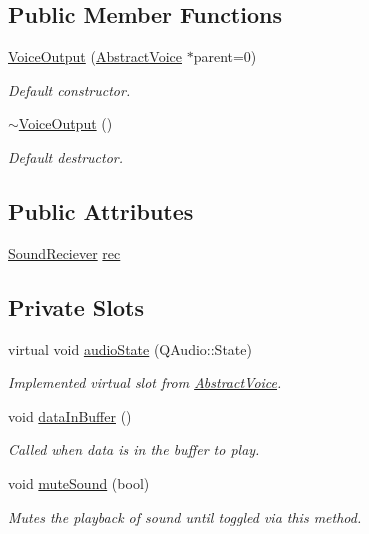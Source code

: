 \subsection*{\-Public \-Member \-Functions}
\begin{DoxyCompactItemize}
\item 
\hyperlink{class_voice_output_a82e8a7dc2eb2de4520e1fbe7e0f71e30}{\-Voice\-Output} (\hyperlink{class_abstract_voice}{\-Abstract\-Voice} $\ast$parent=0)
\begin{DoxyCompactList}\small\item\em \-Default constructor. \end{DoxyCompactList}\item 
\hyperlink{class_voice_output_ab483f1f9a463ed3cd3e5fb265147e51e}{$\sim$\-Voice\-Output} ()
\begin{DoxyCompactList}\small\item\em \-Default destructor. \end{DoxyCompactList}\end{DoxyCompactItemize}
\subsection*{\-Public \-Attributes}
\begin{DoxyCompactItemize}
\item 
\hyperlink{class_sound_reciever}{\-Sound\-Reciever} \hyperlink{class_voice_output_a74bd87b7370dfddcc1976460e009a432}{rec}
\end{DoxyCompactItemize}
\subsection*{\-Private \-Slots}
\begin{DoxyCompactItemize}
\item 
virtual void \hyperlink{class_voice_output_a480bfe9a314254db7efe924c25c17423}{audio\-State} (\-Q\-Audio\-::\-State)
\begin{DoxyCompactList}\small\item\em \-Implemented virtual slot from \hyperlink{class_abstract_voice}{\-Abstract\-Voice}. \end{DoxyCompactList}\item 
void \hyperlink{class_voice_output_a4841e1e12044b587f65b7f43ae977925}{data\-In\-Buffer} ()
\begin{DoxyCompactList}\small\item\em \-Called when data is in the buffer to play. \end{DoxyCompactList}\item 
void \hyperlink{class_voice_output_a7a786388a7203a5ab4dd0ff8f27cbc33}{mute\-Sound} (bool)
\begin{DoxyCompactList}\small\item\em \-Mutes the playback of sound until toggled via this method. \end{DoxyCompactList}\end{DoxyCompactItemize}
